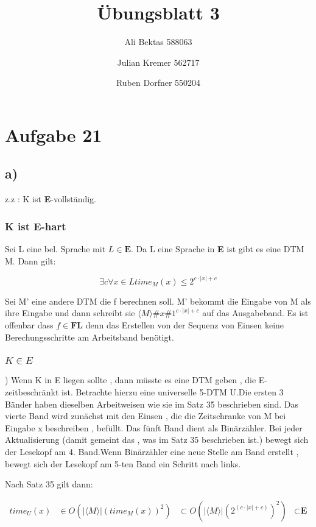 \documentclass{article}
\title{Übungsblatt 3}
\author{Ali Bektas 588063 \and Julian Kremer 562717 \and Ruben Dorfner 550204}
\begin{document}
	

	\maketitle

	
	\section*{Aufgabe 21}
		\subsection*{a)}
			z.z : K ist \textbf{E}-vollständig.

			\subsubsection*{K ist E-hart}
				Sei L eine bel. Sprache mit $L \in \textbf{E}$. Da L eine Sprache in \textbf{E} ist gibt es eine DTM M. Dann gilt: 

					\[
						\exists c \forall x \in L time_M(x) \leq 2^{c \cdot |x| + c}
					\]

				Sei M' eine andere DTM die f berechnen soll. M' bekommt die Eingabe von M als ihre Eingabe und dann schreibt sie $\langle M \rangle \# x \# 1^{c \cdot |x| + c}$ auf das Ausgabeband. Es ist offenbar dass $f \in \textbf{FL}$ denn das Erstellen von der Sequenz von Einsen keine Berechungsschritte am Arbeitsband benötigt. 

			\subsubsection*{$K \in E$ })
				Wenn K in E liegen sollte , dann müsste es eine DTM geben , die E-zeitbeschränkt ist. 
				Betrachte hierzu eine universelle 5-DTM U.Die ersten 3 Bänder haben dieselben Arbeitweisen wie sie im Satz 35 beschrieben sind. Das vierte Band wird zunächst mit den Einsen  , die die Zeitschranke von M bei Eingabe x beschreiben , befüllt. Das fünft Band dient als Binärzähler. 
				Bei jeder Aktualisierung (damit gemeint das , was im Satz 35 beschrieben ist.) bewegt sich der Lesekopf am 4. Band.Wenn Binärzähler eine neue Stelle am Band erstellt , bewegt sich der Lesekopf am 5-ten Band ein Schritt nach links.

				Nach Satz 35 gilt dann:
				
				\begin{align*}
					time_U(x) &\in 
					O(| \langle M \rangle | (time_M(x))^2) &\subset
					O(| \langle M \rangle | (2^(c \cdot |x| + c))^2) &\subset
					\textbf{E}
				\end{align*} 
\end{document}
